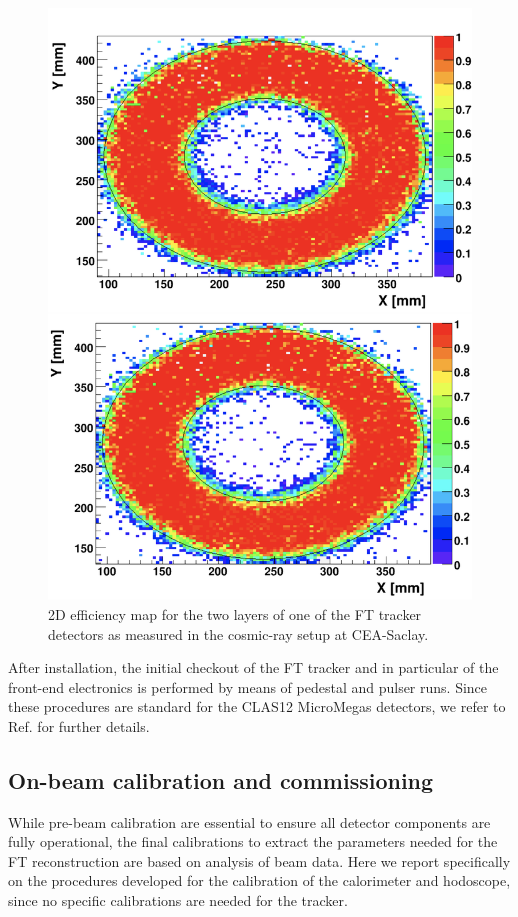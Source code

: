 \begin{figure}[htb]
 \includegraphics[width=0.9\columnwidth,keepaspectratio]{fig/fttrk_cosmic.png}
 \caption{2D efficiency map for the two layers of one of the FT tracker detectors as measured in the cosmic-ray setup at CEA-Saclay.}
 \label{fig:ftt_cosmic}
\end{figure}

After installation, the initial checkout of the FT tracker and in particular of the front-end electronics is performed by means of pedestal and pulser runs. Since these procedures are standard for the CLAS12 MicroMegas detectors, we refer to Ref. \cite{mm} for further details.

\subsection{On-beam calibration and commissioning}
While pre-beam calibration are essential to ensure all detector components are fully operational, the final calibrations to extract the parameters needed for the FT reconstruction are based on analysis of beam data. Here we report specifically on the procedures developed for the calibration of the calorimeter and hodoscope, since no specific calibrations are needed for the tracker.

